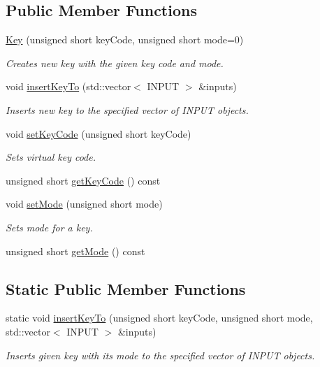 \subsection*{Public Member Functions}
\begin{DoxyCompactItemize}
\item 
\hyperlink{class_key_a26feef290360ca3bba9b5bb6831de445}{Key} (unsigned short key\-Code, unsigned short mode=0)
\begin{DoxyCompactList}\small\item\em Creates new key with the given key code and mode. \end{DoxyCompactList}\item 
void \hyperlink{class_key_ab3097a0cdb61e5e7c1e2f3cba6746a37}{insert\-Key\-To} (std\-::vector$<$ I\-N\-P\-U\-T $>$ \&inputs)
\begin{DoxyCompactList}\small\item\em Inserts new key to the specified vector of I\-N\-P\-U\-T objects. \end{DoxyCompactList}\item 
void \hyperlink{class_key_a2586bfede14e2f7ccc0faf07ec1b6841}{set\-Key\-Code} (unsigned short key\-Code)
\begin{DoxyCompactList}\small\item\em Sets virtual key code. \end{DoxyCompactList}\item 
unsigned short \hyperlink{class_key_a0acebcc2e10270c2f31c1c5f96395fa7}{get\-Key\-Code} () const 
\item 
void \hyperlink{class_key_a87cab00dc5a5e7490e62d48f0560085e}{set\-Mode} (unsigned short mode)
\begin{DoxyCompactList}\small\item\em Sets mode for a key. \end{DoxyCompactList}\item 
unsigned short \hyperlink{class_key_a3c6d49b9f94672a8e17ebf9f37ad3900}{get\-Mode} () const 
\end{DoxyCompactItemize}
\subsection*{Static Public Member Functions}
\begin{DoxyCompactItemize}
\item 
static void \hyperlink{class_key_a4e99bf27b8920e8e16f27691efedf9ba}{insert\-Key\-To} (unsigned short key\-Code, unsigned short mode, std\-::vector$<$ I\-N\-P\-U\-T $>$ \&inputs)
\begin{DoxyCompactList}\small\item\em Inserts given key with its mode to the specified vector of I\-N\-P\-U\-T objects. \end{DoxyCompactList}\end{DoxyCompactItemize}
